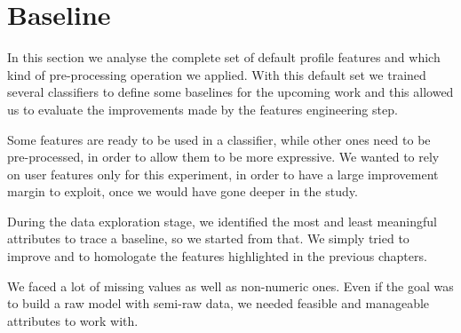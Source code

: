 \section{Baseline}
\label{baseline}
In this section we analyse the complete set of default profile features and which kind of pre-processing operation we applied. With this default set we trained several classifiers to define some baselines for the upcoming work and this allowed us to evaluate the improvements made by the features engineering step.

Some features are ready to be used in a classifier, while other ones need to be pre-processed, in order to allow them to be more expressive.
We wanted to rely on user features only for this experiment, in order to have a large improvement margin to exploit, once we would have gone deeper in the study.

During the data exploration stage, we identified the most and least meaningful attributes to trace a baseline, so we started from that. We simply tried to improve and to homologate the features highlighted in the previous chapters.

We faced a lot of missing values as well as non-numeric ones.
Even if the goal was to build a raw model with semi-raw data, we needed feasible and manageable attributes to work with.

